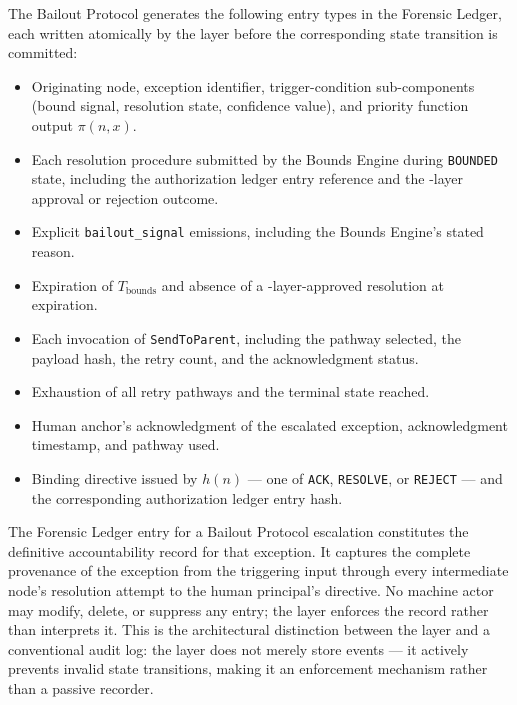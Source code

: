 The Bailout Protocol generates the following entry types in the Forensic
Ledger, each written atomically by the \fact{} layer before the corresponding
state transition is committed:

\begin{itemize}\itemsep=0pt
\item[\texttt{bailout-trigger}] Originating node, exception identifier,
  trigger-condition sub-components (bound signal, resolution state,
  confidence value), and priority function output $\pi(n, x)$.
\item[\texttt{bounds-resolution-attempt}] Each resolution procedure submitted
  by the Bounds Engine during \texttt{BOUNDED} state, including the
  authorization ledger entry reference and the \fact{}-layer approval or
  rejection outcome.
\item[\texttt{bailout-signal}] Explicit \texttt{bailout\_signal} emissions,
  including the Bounds Engine's stated reason.
\item[\texttt{timeout-bounds-expired}] Expiration of $T_{\text{bounds}}$ and
  absence of a \fact{}-layer-approved resolution at expiration.
\item[\texttt{escalation-sent}] Each invocation of \texttt{SendToParent},
  including the pathway selected, the payload hash, the retry count, and the
  acknowledgment status.
\item[\texttt{pathway-exhausted}] Exhaustion of all retry pathways and the
  terminal state reached.
\item[\texttt{human-ack}] Human anchor's acknowledgment of the escalated
  exception, acknowledgment timestamp, and pathway used.
\item[\texttt{human-directive}] Binding directive issued by $h(n)$ --- one of
  \texttt{ACK}, \texttt{RESOLVE}, or \texttt{REJECT} --- and the
  corresponding authorization ledger entry hash.
\end{itemize}

The Forensic Ledger entry for a Bailout Protocol escalation constitutes the
definitive accountability record for that exception.  It captures the complete
provenance of the exception from the triggering input through every
intermediate node's resolution attempt to the human principal's directive.
No machine actor may modify, delete, or suppress any entry; the \fact{} layer
enforces the record rather than interprets it.  This is the architectural
distinction between the \fact{} layer and a conventional audit log: the
\fact{} layer does not merely store events --- it actively prevents invalid
state transitions, making it an enforcement mechanism rather than a passive
recorder.

